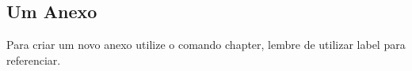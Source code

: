 \begin{anexosenv}
  \partanexos %

  \chapter{Um Anexo}
  \label{ape:anexoI}
  Para criar um novo anexo utilize o comando chapter, lembre de utilizar label para referenciar.


\end{anexosenv}

